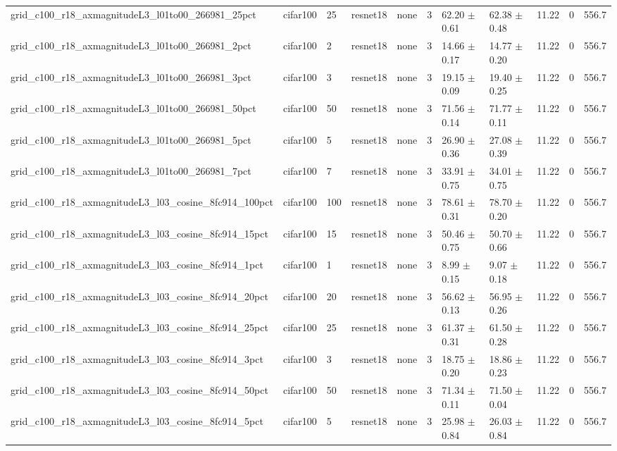 \begin{tabular}{lllllllllll}
grid_c100_r18_axmagnitudeL3_l01to00_266981_25pct & cifar100 & 25 & resnet18 & none & 3 & 62.20 $\pm$ 0.61 & 62.38 $\pm$ 0.48 & 11.22 & 0 & 556.7 \\
grid_c100_r18_axmagnitudeL3_l01to00_266981_2pct & cifar100 & 2 & resnet18 & none & 3 & 14.66 $\pm$ 0.17 & 14.77 $\pm$ 0.20 & 11.22 & 0 & 556.7 \\
grid_c100_r18_axmagnitudeL3_l01to00_266981_3pct & cifar100 & 3 & resnet18 & none & 3 & 19.15 $\pm$ 0.09 & 19.40 $\pm$ 0.25 & 11.22 & 0 & 556.7 \\
grid_c100_r18_axmagnitudeL3_l01to00_266981_50pct & cifar100 & 50 & resnet18 & none & 3 & 71.56 $\pm$ 0.14 & 71.77 $\pm$ 0.11 & 11.22 & 0 & 556.7 \\
grid_c100_r18_axmagnitudeL3_l01to00_266981_5pct & cifar100 & 5 & resnet18 & none & 3 & 26.90 $\pm$ 0.36 & 27.08 $\pm$ 0.39 & 11.22 & 0 & 556.7 \\
grid_c100_r18_axmagnitudeL3_l01to00_266981_7pct & cifar100 & 7 & resnet18 & none & 3 & 33.91 $\pm$ 0.75 & 34.01 $\pm$ 0.75 & 11.22 & 0 & 556.7 \\
grid_c100_r18_axmagnitudeL3_l03_cosine_8fc914_100pct & cifar100 & 100 & resnet18 & none & 3 & 78.61 $\pm$ 0.31 & 78.70 $\pm$ 0.20 & 11.22 & 0 & 556.7 \\
grid_c100_r18_axmagnitudeL3_l03_cosine_8fc914_15pct & cifar100 & 15 & resnet18 & none & 3 & 50.46 $\pm$ 0.75 & 50.70 $\pm$ 0.66 & 11.22 & 0 & 556.7 \\
grid_c100_r18_axmagnitudeL3_l03_cosine_8fc914_1pct & cifar100 & 1 & resnet18 & none & 3 & 8.99 $\pm$ 0.15 & 9.07 $\pm$ 0.18 & 11.22 & 0 & 556.7 \\
grid_c100_r18_axmagnitudeL3_l03_cosine_8fc914_20pct & cifar100 & 20 & resnet18 & none & 3 & 56.62 $\pm$ 0.13 & 56.95 $\pm$ 0.26 & 11.22 & 0 & 556.7 \\
grid_c100_r18_axmagnitudeL3_l03_cosine_8fc914_25pct & cifar100 & 25 & resnet18 & none & 3 & 61.37 $\pm$ 0.31 & 61.50 $\pm$ 0.28 & 11.22 & 0 & 556.7 \\
grid_c100_r18_axmagnitudeL3_l03_cosine_8fc914_3pct & cifar100 & 3 & resnet18 & none & 3 & 18.75 $\pm$ 0.20 & 18.86 $\pm$ 0.23 & 11.22 & 0 & 556.7 \\
grid_c100_r18_axmagnitudeL3_l03_cosine_8fc914_50pct & cifar100 & 50 & resnet18 & none & 3 & 71.34 $\pm$ 0.11 & 71.50 $\pm$ 0.04 & 11.22 & 0 & 556.7 \\
grid_c100_r18_axmagnitudeL3_l03_cosine_8fc914_5pct & cifar100 & 5 & resnet18 & none & 3 & 25.98 $\pm$ 0.84 & 26.03 $\pm$ 0.84 & 11.22 & 0 & 556.7 \\

\end{tabular}
